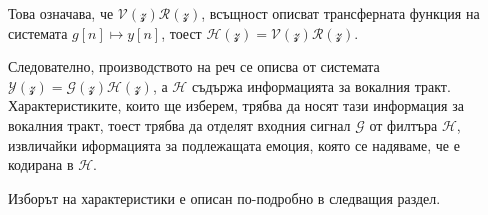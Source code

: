 \documentclass[main.tex]{subfiles}
\begin{document}
Това означава, че $\mathcal{V}(\mathcal{z})\mathcal{R}(\mathcal{z})$, всъщност описват
трансферната функция на системата $g[n] \mapsto y[n]$, тоест $\mathcal{H}(\mathcal{z}
) = \mathcal{V}(\mathcal{z})\mathcal{R}(\mathcal{z})$.

Следователно, производството на реч се описва от системата $\mathcal{Y}(\mathcal{z}) = \mathcal{G}(\mathcal{z})\mathcal{H}(\mathcal{z})$,
а $\mathcal{H}$ съдържа информацията за вокалния тракт.
Характеристиките, които ще изберем, трябва да носят тази информация за вокалния тракт,
тоест трябва да отделят входния сигнал $\mathcal{G}$ от филтъра $\mathcal{H}$, извличайки иформацията
за подлежащата емоция, която се надяваме, че е кодирана в $\mathcal{H}$.

Изборът на характеристики е описан по-подробно в следващия раздел.
\end{document}

